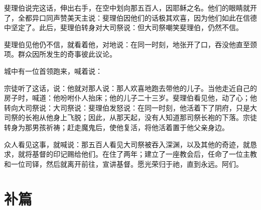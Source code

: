 斐理伯说完这话，伸出右手，在空中划向那五百人，因耶稣之名。他们的眼睛就开了，全都异口同声赞美天主说：斐理伯因他们的话极其欢喜，因为他们如此在信德中坚定了。此后，斐理伯转身对大司祭说：但大司祭嘲笑斐理伯，仍然不信。\par

斐理伯见他仍不信，就看着他，对地说：在同一时刻，地张开了口，吞没他直至颈项。群众因所发生的奇事彼此议论。\par

城中有一位首领跑来，喊着说：\par

宗徒听了这话，说：他就对那人说：那人欢喜地跑去带他的儿子。当他走近自己的房子时，喊道：他吩咐仆人抬床；他的儿子二十三岁。斐理伯看见他，动了心；他转向大司祭说：大司祭说：斐理伯发怒说：在同一时刻，他活着下了阴府，只是大司祭的长袍从他身上飞脱；因此，从那天起，没有人知道那司祭长袍的下落。宗徒转身为那男孩祈祷；赶走魔鬼后，使他复活，将他活着置于他父亲身边。\par

众人看见这事，就喊说：那五百人看见大司祭被吞入深渊，以及其他的奇迹，就恳求，就将基督的印记赐给他们。在住了两年；建立了一座教会后，任命了一位主教和一位司铎，然后就离开前往，宣讲基督。愿光荣归于祂，直到永远。阿们。\par


\section{补篇}

